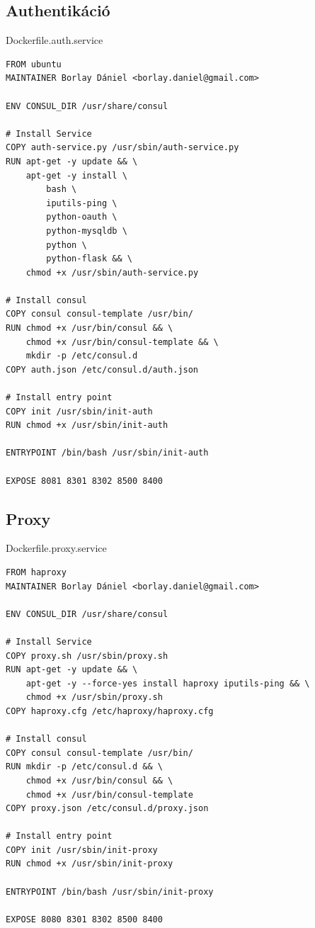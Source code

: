 \documentclass[11pt,magyar,a4paper,twoside,]{report}
\begin{document}
\subsection{Authentikáció}\label{authentikuxe1ciuxf3}

Dockerfile.auth.service

\begin{verbatim}
FROM ubuntu
MAINTAINER Borlay Dániel <borlay.daniel@gmail.com>

ENV CONSUL_DIR /usr/share/consul

# Install Service
COPY auth-service.py /usr/sbin/auth-service.py
RUN apt-get -y update && \
    apt-get -y install \
        bash \
        iputils-ping \
        python-oauth \
        python-mysqldb \
        python \
        python-flask && \
    chmod +x /usr/sbin/auth-service.py

# Install consul
COPY consul consul-template /usr/bin/
RUN chmod +x /usr/bin/consul && \
    chmod +x /usr/bin/consul-template && \
    mkdir -p /etc/consul.d
COPY auth.json /etc/consul.d/auth.json

# Install entry point
COPY init /usr/sbin/init-auth
RUN chmod +x /usr/sbin/init-auth

ENTRYPOINT /bin/bash /usr/sbin/init-auth

EXPOSE 8081 8301 8302 8500 8400
\end{verbatim}

\subsection{Proxy}\label{proxy}

Dockerfile.proxy.service

\begin{verbatim}
FROM haproxy
MAINTAINER Borlay Dániel <borlay.daniel@gmail.com>

ENV CONSUL_DIR /usr/share/consul

# Install Service
COPY proxy.sh /usr/sbin/proxy.sh
RUN apt-get -y update && \
    apt-get -y --force-yes install haproxy iputils-ping && \
    chmod +x /usr/sbin/proxy.sh
COPY haproxy.cfg /etc/haproxy/haproxy.cfg

# Install consul
COPY consul consul-template /usr/bin/
RUN mkdir -p /etc/consul.d && \
    chmod +x /usr/bin/consul && \
    chmod +x /usr/bin/consul-template
COPY proxy.json /etc/consul.d/proxy.json

# Install entry point
COPY init /usr/sbin/init-proxy
RUN chmod +x /usr/sbin/init-proxy

ENTRYPOINT /bin/bash /usr/sbin/init-proxy

EXPOSE 8080 8301 8302 8500 8400
\end{verbatim}
\end{document}
